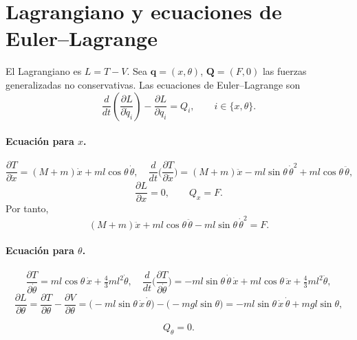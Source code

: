\documentclass[a4paper,openright,9pt]{report}
\begin{document}
\section*{Lagrangiano y ecuaciones de Euler--Lagrange}
El Lagrangiano es \(L = T - V\).
Sea $\bm q=(x,\theta)$, $\bm Q=(F,0)$ las fuerzas generalizadas no conservativas. 
Las ecuaciones de Euler--Lagrange son
\begin{equation}
\frac{d}{dt}\left(\frac{\partial L}{\partial \dot q_i}\right)
-\frac{\partial L}{\partial q_i}
= Q_i,\qquad i\in\{x,\theta\}.
\end{equation}

\paragraph{Ecuación para $x$.}
\begin{equation}
\frac{\partial T}{\partial \dot x}=(M+m)\dot x + m l \cos\theta\,\dot\theta,
\quad
\frac{d}{dt}\Big(\frac{\partial T}{\partial \dot x}\Big)
=(M+m)\ddot x - m l \sin\theta\,\dot\theta^2 + m l \cos\theta\,\ddot\theta,
\end{equation}
\begin{equation}
\frac{\partial L}{\partial x}=0,
\qquad
Q_x=F.
\end{equation}
Por tanto,
\begin{equation}
\boxed{(M+m)\ddot x + m l \cos\theta\,\ddot\theta - m l \sin\theta\,\dot\theta^2 = F.}
\label{eq:x}
\end{equation}

\paragraph{Ecuación para $\theta$.}
\begin{equation}
\frac{\partial T}{\partial \dot\theta}
= m l \cos\theta\,\dot x + \tfrac{4}{3} m l^2 \dot\theta,
\quad
\frac{d}{dt}\Big(\frac{\partial T}{\partial \dot\theta}\Big)
= - m l \sin\theta\,\dot\theta\,\dot x + m l \cos\theta\,\ddot x
  + \tfrac{4}{3} m l^2 \ddot\theta,
\end{equation}
\begin{equation}
\frac{\partial L}{\partial \theta}
= \frac{\partial T}{\partial \theta} - \frac{\partial V}{\partial \theta}
= \big(- m l \sin\theta\,\dot x\,\dot\theta\big) - \big(- m g l \sin\theta\big)
= - m l \sin\theta\,\dot x\,\dot\theta + m g l \sin\theta,
\end{equation}

\begin{equation}
Q_\theta = 0.
\end{equation}
\end{document}
